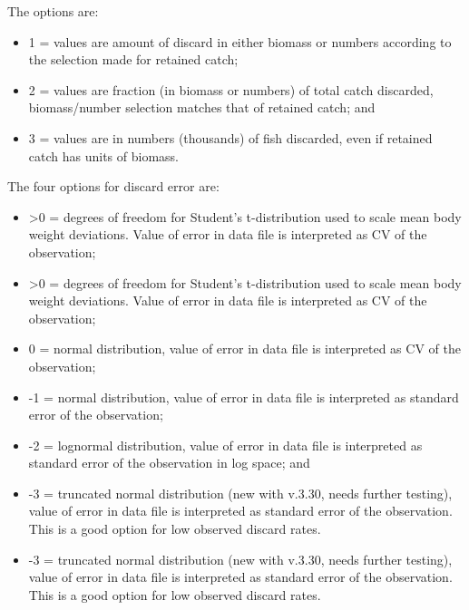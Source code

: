 The options are:
\begin{itemize}
	\item 1 = values are amount of discard in either biomass or numbers according to the selection made for retained catch;
	\item 2 = values are fraction (in biomass or numbers) of total catch discarded, biomass/number selection matches that of retained catch; and
	\item 3 = values are in numbers (thousands) of fish discarded, even if retained catch has units of biomass.
\end{itemize}

The four options for discard error are:
\begin{itemize}
	\item >0 = degrees of freedom for Student's t-distribution used to scale mean body weight deviations. Value of error in data file is interpreted as CV of the observation;
	\item >0 = degrees of freedom for Student's t-distribution used to scale mean body weight deviations. Value of error in data file is interpreted as CV of the observation;
	\item 0 = normal distribution, value of error in data file is interpreted as CV of the observation;
	\item -1 = normal distribution, value of error in data file is interpreted as standard error of the observation;
	\item -2 = lognormal distribution, value of error in data file is interpreted as standard error of the observation in log space; and 
	\item -3 = truncated normal distribution (new with v.3.30, needs further testing), value of error in data file is interpreted as standard error of the observation. This is a good option for low observed discard rates.
	\item -3 = truncated normal distribution (new with v.3.30, needs further testing), value of error in data file is interpreted as standard error of the observation. This is a good option for low observed discard rates.
\end{itemize}

